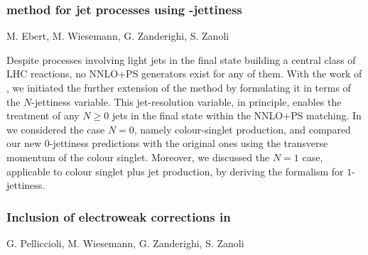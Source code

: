 \documentclass{FBR_Bericht_2025}
\begin{document}
\begin{refsection}
\subsubsection[\minnlo{} method for jet processes using $N$-jettiness]{\minnlo{} method for jet processes using -jettiness}
\begin{Namen}
M. Ebert, M. Wiesemann, G. Zanderighi, S. Zanoli
\end{Namen}
Despite processes involving light jets in the final state building a 
central class of LHC reactions, no NNLO+PS generators exist for any of them.
With the work of , we initiated the further extension of the \minnlo{} method by
formulating it in terms of the $N$-jettiness variable. This jet-resolution variable,
in principle, enables the treatment of any $N\ge 0$ jets in the final state within the 
NNLO+PS matching. In  we considered the case $N=0$, namely colour-singlet
production, and compared our new $0$-jettiness predictions with the original \minnlo{}
ones using the transverse momentum of the colour singlet.
Moreover, we discussed the $N=1$ case, applicable to colour singlet
plus jet production, by deriving the \minnlo{} formalism for $1$-jettiness.
%
\subsubsection{Inclusion of electroweak corrections in \minnlo{}}
\begin{Namen}
G. Pelliccioli, M. Wiesemann, G. Zanderighi, S. Zanoli
\end{Namen}


\end{refsection}
\end{document}
